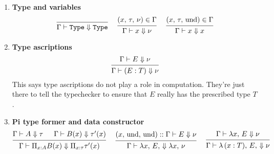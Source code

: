 \documentclass{article}
\begin{document}

\begin{enumerate}
\item \textbf{Type and variables}
  \begin{gather*}
    \begin{prooftree}
      \infer0{\Gamma \vdash \Type \Downarrow \Type} 
    \end{prooftree}
   ~ \quad
    \begin{prooftree}
      \hypo{(x, \, \tau, \, \nu) \in \Gamma}
      \infer1{\Gamma \vdash x \Downarrow \nu}
    \end{prooftree} 
    ~ \quad
    \begin{prooftree}
      \hypo{(x, \, \tau, \, \text{und}) \in \Gamma}
      \infer1{\Gamma \vdash x \Downarrow x}
    \end{prooftree}
  \end{gather*}

\item \textbf{Type ascriptions} \\
  \[
    \begin{prooftree}
      \hypo{\Gamma \vdash E \Downarrow \nu}
      \infer1{\Gamma \vdash (E : T) \Downarrow \nu}
    \end{prooftree}
  \]
  This says type ascriptions do not play a role in computation. They're just
  there to tell the typechecker to ensure that $E$ really has the prescribed type
  $T$.

 \item \textbf{Pi type former and data constructor} \\
  \begin{gather*}
    \begin{prooftree}
      \hypo{\Gamma \vdash A \Downarrow \tau}
      \hypo{\Gamma \vdash B(x) \Downarrow \tau'(x)}
      \infer2{\Gamma \vdash \Pi_{x : A} B(x) \Downarrow \Pi_{x : \tau} \tau'(x)}
    \end{prooftree}
    ~ \quad
    \begin{prooftree}
      \hypo{(x, \, \text{und}, \, \text{und}) :: \Gamma \vdash E \Downarrow \nu}
      \infer1{\Gamma \vdash \lambda x, \, E, \, \Downarrow \lambda x, \, \nu}
    \end{prooftree}
    ~ \quad
    \begin{prooftree}
      \hypo{\Gamma \vdash \lambda x, \, E \Downarrow \nu}
      \infer1{\Gamma \vdash \lambda \, (x : T), \, E, \, \Downarrow \nu}
    \end{prooftree}
  \end{gather*}
 

\end{enumerate}
\end{document}
